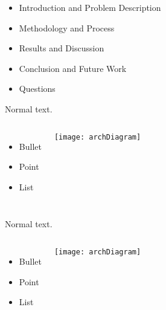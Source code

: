 
\begin{frame}

  \begin{itemize}
    \item Introduction and Problem Description
    \item Methodology and Process
    \item Results and Discussion  
    \item Conclusion and Future Work
    \item Questions
  \end{itemize}
  
\end{frame}

\begin{frame}
  Normal text.

  \begin{columns}
      \begin{itemize}
      \item Bullet
      \item Point
      \item List
      \end{itemize}

      \texttt{[image: archDiagram]}
    \end{columns}
  
\end{frame}

\begin{frame}
  Normal text.

  \begin{columns}
      \begin{itemize}
      \item Bullet
      \item Point
      \item List
      \end{itemize}

      \texttt{[image: archDiagram]}
    \end{columns}
  
\end{frame}

